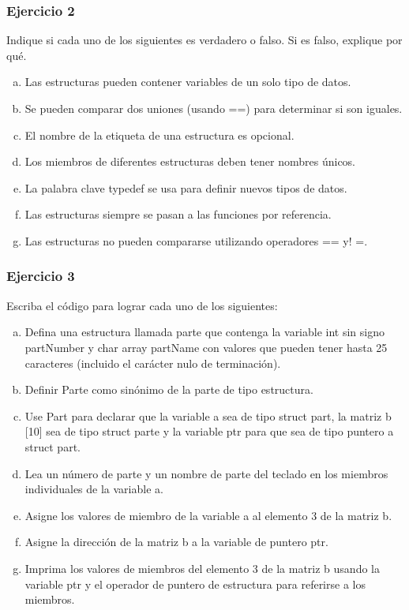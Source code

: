 \subsubsection{Ejercicio 2} 
Indique si cada uno de los siguientes es verdadero o falso. Si es falso, explique por qué.
\begin{enumerate}[a)]
  \item Las estructuras pueden contener variables de un solo tipo de datos.
  \item Se pueden comparar dos uniones (usando ==) para determinar si son iguales.
  \item El nombre de la etiqueta de una estructura es opcional.
  \item Los miembros de diferentes estructuras deben tener nombres únicos.
  \item La palabra clave typedef se usa para definir nuevos tipos de datos.
  \item Las estructuras siempre se pasan a las funciones por referencia.
  \item Las estructuras no pueden compararse utilizando operadores == y! =.
\end{enumerate}

\subsubsection{Ejercicio 3} 
Escriba el código para lograr cada uno de los siguientes:
\begin{enumerate}[a)]
  \item Defina una estructura llamada parte que contenga la variable int sin signo partNumber y char array partName con valores que pueden tener hasta 25 caracteres (incluido el carácter nulo de terminación).
  \item Definir Parte como sinónimo de la parte de tipo estructura.
  \item Use Part para declarar que la variable a sea de tipo struct part, la matriz b [10] sea de tipo struct parte y la variable ptr para que sea de tipo puntero a struct part.
  \item Lea un número de parte y un nombre de parte del teclado en los miembros individuales de la variable a.
  \item Asigne los valores de miembro de la variable a al elemento 3 de la matriz b.
  \item Asigne la dirección de la matriz b a la variable de puntero ptr.
  \item Imprima los valores de miembros del elemento 3 de la matriz b usando la variable ptr y el operador de puntero de estructura para referirse a los miembros.
\end{enumerate}
